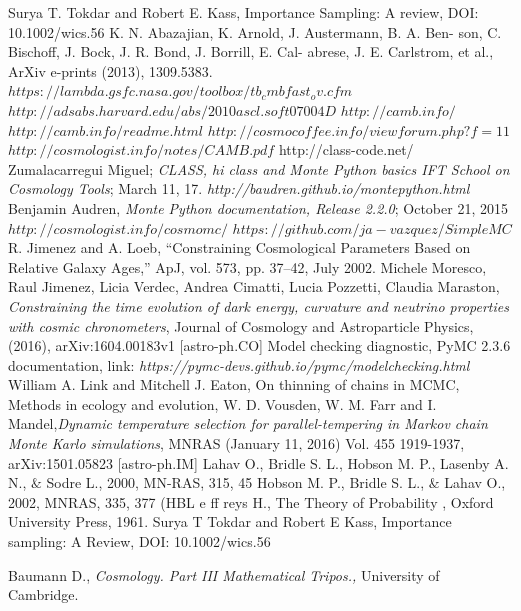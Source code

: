 \documentclass[onecolumn,           %
               showpacs,            %
               preprintnumbers,     %
               aps,                 %
               prl,          	    %
               letterpaper,             %
               superscriptaddress,      %
               nofootinbib,         %
               tightenlines,        %
               floats,floatfix      %
               ,usenatbib,
               ]{revtex4-1}
\begin{document}
\begin{thebibliography}{9}
 Surya T. Tokdar and Robert E. Kass, Importance Sampling: A review, DOI: 10.1002/wics.56
%
%
%
%
 K. N. Abazajian, K. Arnold, J. Austermann, B. A. Ben-
son, C. Bischoff, J. Bock, J. R. Bond, J. Borrill, E. Cal-
abrese,  J.  E.  Carlstrom,  et  al.,  ArXiv  e-prints  (2013),
1309.5383.
$https://lambda.gsfc.nasa.gov/toolbox/tb_cmbfast_ov.cfm$
$http://adsabs.harvard.edu/abs/2010ascl.soft07004D$
$http://camb.info/$
$http://camb.info/readme.html$
$http://cosmocoffee.info/viewforum.php?f=11$
 $http://cosmologist.info/notes/CAMB.pdf$
 http://class-code.net/
Zumalacarregui Miguel; \textit{CLASS, hi class and Monte Python basics IFT School on Cosmology Tools}; March 11, 17.
\textit{http://baudren.github.io/montepython.html}
Benjamin Audren, \textit{Monte Python documentation, Release 2.2.0}; October 21, 2015
$http://cosmologist.info/cosmomc/$	
$https://github.com/ja-vazquez/SimpleMC$
%
%
%
%
%
%
R. Jimenez and A. Loeb, “Constraining Cosmological Parameters Based on Relative Galaxy Ages,”
ApJ, vol. 573, pp. 37–42, July 2002.
Michele Moresco, Raul Jimenez, Licia Verdec, Andrea Cimatti, Lucia Pozzetti, Claudia Maraston, \textit{Constraining the time evolution of dark energy, curvature and neutrino properties with cosmic chronometers}, Journal of Cosmology and Astroparticle Physics, (2016), arXiv:1604.00183v1 [astro-ph.CO]
 Model checking diagnostic, PyMC 2.3.6 documentation, link: \textit{https://pymc-devs.github.io/pymc/modelchecking.html}
William A. Link and Mitchell J. Eaton, On thinning of chains in MCMC, Methods in ecology and evolution,
W. D. Vousden, W. M. Farr and I. Mandel,\textit{Dynamic temperature selection for parallel-tempering in Markov chain Monte Karlo simulations}, MNRAS (January 11, 2016) Vol. 455 1919-1937, arXiv:1501.05823 [astro-ph.IM]
Lahav O., Bridle S. L., Hobson M. P., Lasenby A. N., $\&$ Sodre L., 2000, MN-RAS, 315, 45
Hobson M. P., Bridle S. L., $\&$ Lahav O., 2002, MNRAS, 335, 377 (HBL
e
ff
reys H.,
The Theory of Probability
, Oxford University Press, 1961.
Surya T Tokdar and Robert E Kass, Importance sampling: A Review, DOI: 10.1002/wics.56

 Baumann D., \textit{Cosmology. Part III Mathematical Tripos.,} University of Cambridge.


\end{thebibliography}
\end{document}
